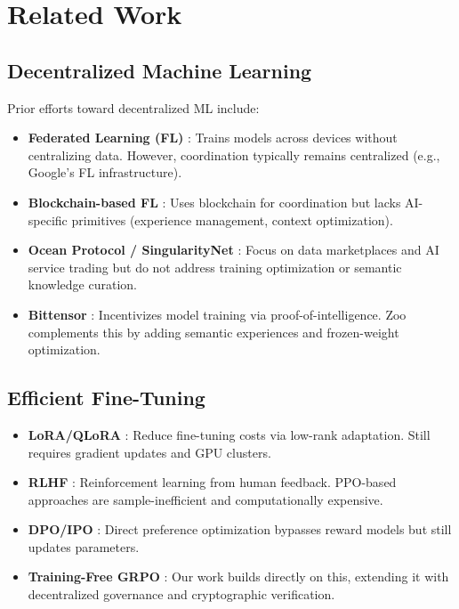 \section{Related Work}


\subsection{Decentralized Machine Learning}

Prior efforts toward decentralized ML include:

\begin{itemize}[leftmargin=*]
\item \textbf{Federated Learning (FL)} \cite{mcmahan2017federated}: Trains models across devices without centralizing data. However, coordination typically remains centralized (e.g., Google's FL infrastructure).
\item \textbf{Blockchain-based FL} \cite{kim2019blockchained}: Uses blockchain for coordination but lacks AI-specific primitives (experience management, context optimization).
\item \textbf{Ocean Protocol / SingularityNet} \cite{ocean2021whitepaper,singularitynet2021whitepaper}: Focus on data marketplaces and AI service trading but do not address training optimization or semantic knowledge curation.
\item \textbf{Bittensor} \cite{bittensor2021whitepaper}: Incentivizes model training via proof-of-intelligence. Zoo complements this by adding semantic experiences and frozen-weight optimization.
\end{itemize}

\subsection{Efficient Fine-Tuning}

\begin{itemize}[leftmargin=*]
\item \textbf{LoRA/QLoRA} \cite{hu2021lora,dettmers2023qlora}: Reduce fine-tuning costs via low-rank adaptation. Still requires gradient updates and GPU clusters.
\item \textbf{RLHF} \cite{ouyang2022training}: Reinforcement learning from human feedback. PPO-based approaches are sample-inefficient and computationally expensive.
\item \textbf{DPO/IPO} \cite{rafailov2023dpo}: Direct preference optimization bypasses reward models but still updates parameters.
\item \textbf{Training-Free GRPO} \cite{tencent2025grpo}: Our work builds directly on this, extending it with decentralized governance and cryptographic verification.
\end{itemize}

